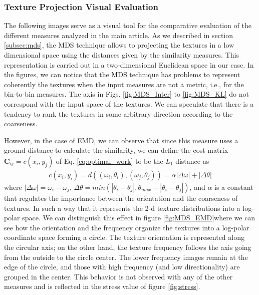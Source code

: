 \pagebreak
\subsubsection{Texture Projection Visual Evaluation}\label{sec:sm_mds}

The following images serve as a visual tool for the comparative evaluation of the different measures analyzed in the main article. As we described in section \ref{subsec:mds}, the MDS technique allows to projecting the textures in a low dimensional space using the distances given by the similarity measures. This representation is carried out in a two-dimensional Euclidean space in our case. In the figures, we can notice that the MDS technique has problems to represent coherently the textures when the input measures are not a metric, i.e., for the bin-to-bin measures. The axis in  Figs. \ref{fig:MDS_Inter} to \ref{fig:MDS_KL} do not correspond with the input space of the textures. We can speculate that there is a tendency to rank the textures in some arbitrary direction according to the coarseness.

However, in the case of EMD, we can observe that since this measure uses a ground distance to calculate the similarity, we can define the cost matrix $\mathbf{C}_{ij} = c(x_i, y_j)$ of Eq. \ref{eq:optimal_work} to be the $L_1$-distance as
\begin{eqnarray} 
 c(x_i, y_i) = d((\omega_i, \theta_i), (\omega_j, \theta_j))=\alpha|\Delta \omega| + |\Delta \theta| \label{eq:ground_distance}
\end{eqnarray}
where $|\Delta \omega| = \omega_i - \omega_j$, $\Delta \theta=min(|\theta_i-\theta_j|, \theta_{max} - |\theta_i-\theta_j|)$, and $\alpha$ is a constant that regulates the importance between the orientation and the coarseness of textures. In such a way that it represents the 2-d texture distributions into a log-polar space. We can distinguish this effect in figure \ref{fig:MDS_EMD}where we can see how the orientation and the frequency organize the textures into a log-polar coordinate space forming a circle. The texture orientation is represented along the circular axis; on the other hand, the texture frequency follows the axis going from the outside to the circle center. The lower frequency images remain at the edge of the circle, and those with high frequency (and low directionality) are grouped in the center. This behavior is not observed with any of the other measures and is reflected in the stress value of figure \ref{fig:stress}.

